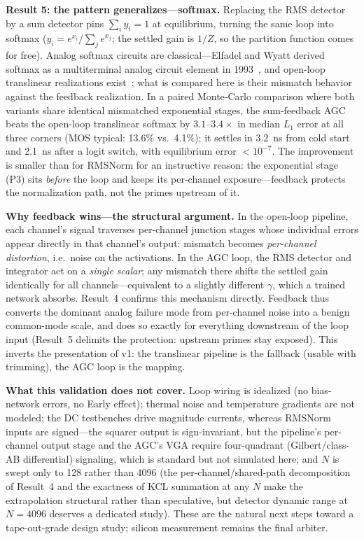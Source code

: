 \documentclass[11pt]{article}
\begin{document}
\textbf{Result 5: the pattern generalizes---softmax.} Replacing the RMS detector by a sum detector pins $\sum_i y_i = 1$ at equilibrium, turning the same loop into softmax ($y_i = e^{x_i}/\sum_j e^{x_j}$; the settled gain is $1/Z$, so the partition function comes for free). Analog softmax circuits are classical---Elfadel and Wyatt derived softmax as a multiterminal analog circuit element in 1993~\cite{elfadel1993}, and open-loop translinear realizations exist~\cite{sillman2023}; what is compared here is their mismatch behavior against the feedback realization. In a paired Monte-Carlo comparison where both variants share identical mismatched exponential stages, the sum-feedback AGC beats the open-loop translinear softmax by $3.1$--$3.4\times$ in median $L_1$ error at all three corners (MOS typical: 13.6\% vs.\ 4.1\%); it settles in 3.2~ns from cold start and 2.1~ns after a logit switch, with equilibrium error $<\!10^{-7}$. The improvement is smaller than for RMSNorm for an instructive reason: the exponential stage (P3) sits \textit{before} the loop and keeps its per-channel exposure---feedback protects the normalization path, not the primes upstream of it.

\textbf{Why feedback wins---the structural argument.} In the open-loop pipeline, each channel's signal traverses per-channel junction stages whose individual errors appear directly in that channel's output: mismatch becomes \textit{per-channel distortion}, i.e.\ noise on the activations. In the AGC loop, the RMS detector and integrator act on a \textit{single scalar}; any mismatch there shifts the settled gain identically for all channels---equivalent to a slightly different $\gamma$, which a trained network absorbs. Result~4 confirms this mechanism directly. Feedback thus converts the dominant analog failure mode from per-channel noise into a benign common-mode scale, and does so exactly for everything downstream of the loop input (Result~5 delimits the protection: upstream primes stay exposed). This inverts the presentation of v1: the translinear pipeline is the fallback (usable with trimming), the AGC loop is the mapping.

\textbf{What this validation does not cover.} Loop wiring is idealized (no bias-network errors, no Early effect); thermal noise and temperature gradients are not modeled; the DC testbenches drive magnitude currents, whereas RMSNorm inputs are signed---the squarer output is sign-invariant, but the pipeline's per-channel output stage and the AGC's VGA require four-quadrant (Gilbert/class-AB differential) signaling, which is standard but not simulated here; and $N$ is swept only to 128 rather than 4096 (the per-channel/shared-path decomposition of Result~4 and the exactness of KCL summation at any $N$ make the extrapolation structural rather than speculative, but detector dynamic range at $N=4096$ deserves a dedicated study). These are the natural next steps toward a tape-out-grade design study; silicon measurement remains the final arbiter.
\end{document}
